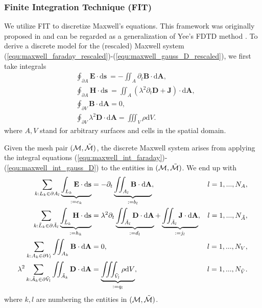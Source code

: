 \documentclass{article}
\begin{document}
\subsubsection{Finite Integration Technique (FIT)} \label{sec:fit}
We utilize FIT to discretize Maxwell's equations. This framework was originally proposed in \cite{weiland_1977} and can be regarded as a generalization of Yee's FDTD method \cite{yee_1966}. To derive a discrete model for the (rescaled) Maxwell system (\ref{equ:maxwell_faraday_rescaled})-(\ref{equ:maxwell_gauss_D_rescaled}), we first take integrals  
\begin{subequations}
\begin{align}
    &\oint_{\partial A} \mathbf{E} \cdot \text{d}\mathbf{s} \ = - \iint_A {\partial_t \mathbf{B}} \cdot \text{d}\mathbf{A}, \label{equ:maxwell_int_faraday}\\
    &\oint_{\partial A} \mathbf{H} \cdot \text{d}\mathbf{s} \ = \iint_A \left({\lambda^2\partial_t \mathbf{D}} + \mathbf{J}\right) \cdot \text{d}\mathbf{A}, \label{equ:maxwell_int_ampere}\\
    &\oint_{\partial V} \mathbf{B} \cdot \text{d}\mathbf{A} = 0, \label{equ:maxwell_int_gauss_B}\\
    &\oint_{\partial V} \lambda^2\mathbf{D} \cdot \text{d}\mathbf{A} = \iiint_V \rho \text{d}V. \label{equ:maxwell_int_gauss_D}
\end{align}
\end{subequations}
where $A, V$ stand for arbitrary surfaces and cells in the spatial domain. 

Given the mesh pair $(\mathcal{M}, \Tilde{\mathcal{M}})$, the discrete Maxwell system arises from applying the integral equations (\ref{equ:maxwell_int_faraday})-(\ref{equ:maxwell_int_gauss_D}) to the entities in $(\mathcal{M}, \Tilde{\mathcal{M}})$. We end up with
\begin{subequations}
\begin{align}
    \sum_{k:L_k\in\partial A_l} \underbrace{\int_{L_k} \mathbf{E} \cdot \text{d}\mathbf{s}}_{:= e_k} &= - {\partial_t} \underbrace{\iint_{A_l} \mathbf{B} \cdot \text{d}\mathbf{A}}_{:= b_l},&l = 1,...,N_A, \label{equ:maxwell_grid_faraday} \\
    \sum_{k:\Tilde{L}_k\in\partial \Tilde{A}_l} \underbrace{\int_{\Tilde{L}_k} \mathbf{H} \cdot \text{d}\mathbf{s}}_{:= h_k} &= \lambda^2{\partial_t} \underbrace{\iint_{\Tilde{A}_l} \mathbf{D} \cdot \text{d}\mathbf{A}}_{:= d_l} + \underbrace{\iint_{\Tilde{A}_l} \mathbf{J} \cdot \text{d}\mathbf{A}}_{:= j_l}, &l = 1,...,N_{\Tilde{A}}, \label{equ:maxwell_grid_ampere}\\
    \sum_{k:A_k\in \partial V_l} \iint_{A_k} \mathbf{B} \cdot \text{d}\mathbf{A} &= 0,&l = 1,..., N_V,\label{equ:maxwell_grid_gauss_B}\\
    \lambda^2\sum_{k:\Tilde{A}_k \in \partial\Tilde{V}_l}\iint_{\Tilde{A}_k} \mathbf{D} \cdot \text{d}\mathbf{A} &= \underbrace{\iiint_{\Tilde{V}_l} \rho \text{d}V}_{:= q_l},&l = 1,...,N_{\Tilde{V}}. \label{equ:maxwell_grid_gauss_D}
\end{align}
\end{subequations}
where $k, l$ are numbering the entities in $(\mathcal{M}, \Tilde{\mathcal{M}})$.
\end{document}
